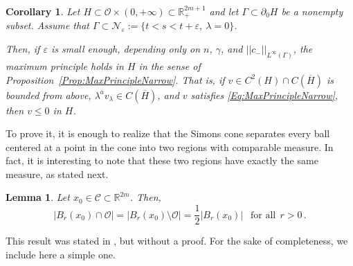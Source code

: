 \documentclass[12pt,reqno]{amsart}
\newtheorem{lemma}[theorem]{Lemma}
\newtheorem{corollary}[theorem]{Corollary}
\theoremstyle{definition}
\theoremstyle{remark}
\newcommand{\con}[1]{\mathbb{#1}}
\newcommand{\R}{\con{R}} %
\newcommand{\ccal}{\mathscr{C}}
\newcommand{\ncal}{\mathcal{N}}
\newcommand{\ocal}{\mathcal{O}}
\newcommand{\norm}[1]{\left | \left |{#1} \right | \right |}
\newcommand{\s}{\gamma}
\numberwithin{equation}{section}
\begin{document}
\begin{corollary}
\label{Cor:MaxPrincipleNarrowSaddle}
Let $H\subset \ocal \times (0, +\infty) \subset \R^{2m + 1}_+$ and let $\Gamma \subset \partial_0 H$ be a nonempty subset. Assume that $\Gamma \subset \ncal_\varepsilon := \{t < s < t+\varepsilon, \ \lambda= 0 \}$. 

Then, if $\varepsilon$ is small enough, depending only on $n$, $\s$, and $\norm{c_-}_{L^\infty(\Gamma)}$, the maximum principle holds in $H$ in the sense of Proposition~\ref{Prop:MaxPrincipleNarrow}. That is, if $v \in C^2 (H)\cap C(\overline{H})$ is bounded from above, $\lambda^a v_\lambda \in C (\overline{H})$, and $v$ satisfies \eqref{Eq:MaxPrincipleNarrow}, then $v\leq 0$ in $H$.
\end{corollary}

To prove it, it is enough to realize that the Simons cone separates every ball centered at a point in the cone into two regions with comparable measure. In fact, it is interesting to note that these two regions have exactly the same measure, as stated next.

\begin{lemma}
\label{Lemma:HalfBallSimonsCone}
Let $x_0\in \ccal\subset \R^{2m}$. Then, 
$$ | B_r(x_0)\cap \ocal| = | B_r(x_0)\setminus \ocal| = \frac{1}{2} |B_r(x_0)| \ \ \textrm{ for all} \ \ r>0\,. $$
\end{lemma}

This result was stated in \cite{Cabre-Saddle}, but without a proof. For the sake of completeness, we include here a simple one.
\end{document}
